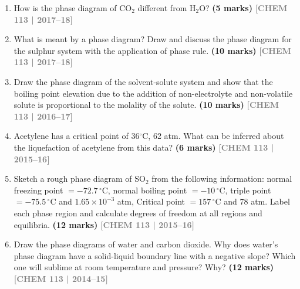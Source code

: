 \documentclass[12pt,a3paper]{article}
\newcommand{\yr}[1]{\hfill\textcolor{gray}{\small\textbf{[#1]}}}
\newcommand{\mk}[1]{\textcolor{orange!70!black}{\small\textbf{(#1 marks)}}}
\begin{document}
\begin{enumerate}




\item How is the phase diagram of CO$_2$ different from H$_2$O? \mk{5}
\yr{CHEM 113 | 2017--18}





\item What is meant by a phase diagram? Draw and discuss the phase diagram for the sulphur system with the application of phase rule. \mk{10}
\yr{CHEM 113 | 2017--18}




\item Draw the phase diagram of the solvent-solute system and show that the boiling point elevation due to the addition of non-electrolyte and non-volatile solute is proportional to the molality of the solute. \mk{10}
\yr{CHEM 113 | 2016--17}




\item Acetylene has a critical point of 36$^\circ$C, 62 atm. What can be inferred about the liquefaction of acetylene from this data? \mk{6}
\yr{CHEM 113 | 2015--16}




\item Sketch a rough phase diagram of SO$_2$ from the following information: normal freezing point $= -72.7\,^\circ$C, normal boiling point $= -10\,^\circ$C, triple point $= -75.5\,^\circ$C and $1.65 \times 10^{-3}$ atm, Critical point $= 157\,^\circ$C and 78 atm. Label each phase region and calculate degrees of freedom at all regions and equilibria. \mk{12}
\yr{CHEM 113 | 2015--16}




\item Draw the phase diagrams of water and carbon dioxide. Why does water's phase diagram have a solid-liquid boundary line with a negative slope? Which one will sublime at room temperature and pressure? Why? \mk{12}
\yr{CHEM 113 | 2014--15}


\end{enumerate}
\end{document}
